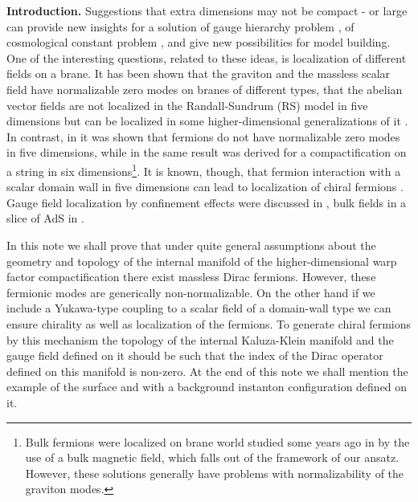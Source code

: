 \documentclass[a4paper,12pt]{article}
\begin{document}
{\bf Introduction.} Suggestions that extra dimensions may not be
compact \cite{RS1}-\cite{rusu} or large \cite{ant,ant1} can provide
new insights for a solution of gauge hierarchy problem \cite{ant1},
of cosmological constant problem \cite{RS2,seif}, and give new
possibilities  for model building. One of the interesting questions,
related to these ideas, is localization of different fields on a
brane. It has been shown that the graviton \cite{rusu} and the
massless scalar field \cite{baj} have normalizable zero modes on
branes of different types, that the abelian vector fields are not
localized in the Randall-Sundrum (RS) model in five dimensions but
can be localized in some higher-dimensional generalizations of it
\cite{oda}. In contrast, in \cite{baj} it was shown that fermions do
not have normalizable zero modes in five dimensions, while in
\cite{oda} the same result was derived for a compactification on a
string \cite{gs,rg} in six dimensions\footnote{Bulk fermions were
localized on brane world studied some years ago in \cite{GW} by the
use of a bulk magnetic field, which falls out of the framework of our
ansatz. However, these solutions generally have problems with
normalizability of the graviton modes.}. It is known, though, that
fermion interaction with a scalar domain wall in five dimensions can
lead to localization of chiral fermions \cite{RS1}. Gauge field
localization by confinement effects were discussed in
\cite{Dvali:1997xe}, bulk fields in a slice of AdS in
\cite{Gherghetta:2000qt}.

In this note we shall prove that under quite general assumptions 
about the geometry and topology of the internal manifold of the
higher-dimensional warp factor compactification there exist massless
Dirac fermions. However, these fermionic modes are generically
non-normalizable. On the other hand if we include a Yukawa-type
coupling to a scalar field of a domain-wall type we can ensure
chirality as well as localization of the fermions. To generate chiral
fermions by this mechanism the topology of the internal Kaluza-Klein
manifold and the gauge field defined on it should be such that the
index of the Dirac operator defined on this manifold is non-zero. At
the end of this note we shall mention the example of the \coordHE{}
surface and \coordHE{} with a background instanton configuration defined
on it.
\end{document}
